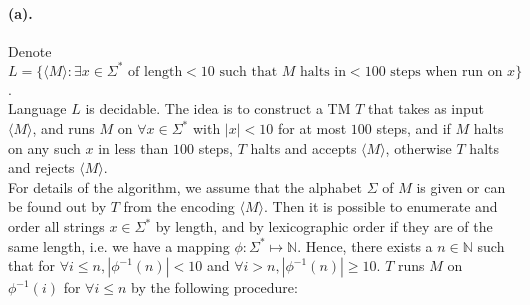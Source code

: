 \documentclass[12pt]{article}
\begin{document}
\paragraph*{(a).} Denote \(L = \{\langle M \rangle : \exists x \in \Sigma^* \text{ of length} < 10 \text{ such that } M \text{ halts in} < 100 \text{ steps when run on } x\}\).\\ 
Language \(L\) is decidable. The idea is to construct a TM \(T\) that takes as input \(\langle M \rangle\), and runs \(M\) on \(\forall x \in \Sigma^*\) with \(|x| < 10\) for at most \(100\) steps, and if \(M\) halts on any such \(x\) in less than \(100\) steps, \(T\) halts and accepts \(\langle M \rangle\), otherwise \(T\) halts and rejects \(\langle M \rangle\).\\
For details of the algorithm, we assume that the alphabet \(\Sigma\) of \(M\) is given or can be found out by \(T\) from the encoding \(\langle M \rangle\). Then it is possible to enumerate and order all strings \(x \in \Sigma^*\) by length, and by lexicographic order if they are of the same length, i.e. we have a mapping \(\phi : \Sigma^* \mapsto \mathbb{N}\). Hence, there exists a \(n \in \mathbb{N}\) such that for \(\forall i \leq n, |\phi^{-1}(n)| < 10\) and \(\forall i > n,  |\phi^{-1}(n)| \geq 10\). \(T\) runs \(M\) on \(\phi^{-1}(i)\) for \(\forall i \leq n \) by the following procedure:
\end{document}
